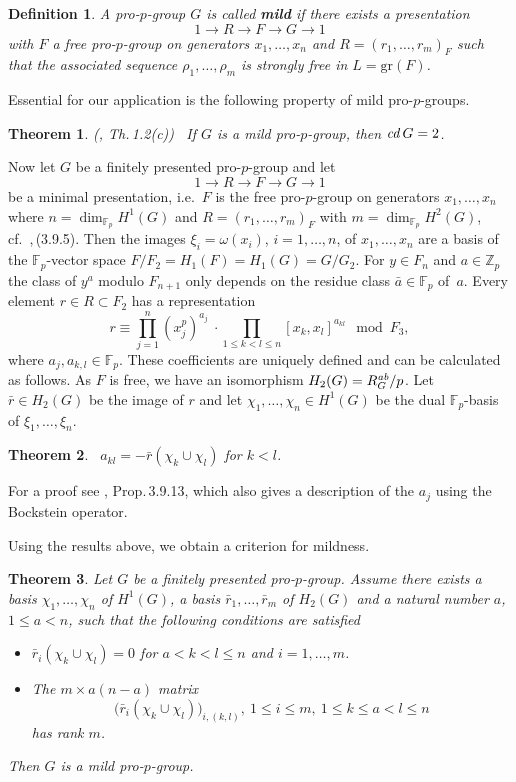 \documentclass[10pt]{article}
\newcommand{\Z}{{\mathbb Z}}
\newcommand{\F}{{\mathbb F}}
\newcommand{\ab}{\text{\it ab}}
\newcommand{\cd}{\text{\it cd}\:}
\newcommand{\gr}{\textrm{gr}}
\newcommand{\lang}{\longrightarrow}
\theoremstyle{alex}
\newtheorem{theorem}{Theorem}[section]
\theoremstyle{alexdef}
\newtheorem*{definition}{Definition}
\begin{document}
\begin{definition}
 A pro-$p$-group $G$ is called {\bf mild} if there exists a presentation
\[
1 \lang R \lang F \lang G \lang 1
\]
with $F$ a free pro-$p$-group on generators $x_1,\ldots,x_n$ and $R=(r_1,\ldots,r_m)_F$ such that the associated sequence  $\rho_1,\ldots,\rho_m$ is strongly free in $L=\gr(F)$.
\end{definition}

Essential for our application is the following property of mild pro-$p$-groups.

\begin{theorem}{\rm (\cite{La}, Th.\,1.2(c))} \label{mildcd2} \
If\/ $G$ is a mild pro-$p$-group, then $\cd G=2$.
\end{theorem}

Now let $G$ be a finitely presented pro-$p$-group and let
\[
1\lang R \lang F\lang G\lang 1
\]
be a minimal presentation, i.e.\ $F$ is the free pro-$p$-group on generators $x_1,\ldots, x_n$ where $n=\dim_{\F_p} H^1(G)$ and $R=(r_1,\ldots,r_m)_F$ with $m=\dim_{\F_p} H^2(G)$, cf.\ \cite{NSW},\,(3.9.5). Then the images $\xi_i=\omega(x_i)$, $i=1,\ldots, n$, of $x_1, \ldots, x_n$ are a basis of the $\F_p$-vector space  $F/F_2=H_1(F)=H_1(G)=G/G_2$.  For $y\in F_n$ and $a\in \Z_p$ the class of $y^a$ modulo $F_{n+1}$ only depends on the residue class $\bar a \in \F_p$ of~$a$.
Every element $r\in R\subset F_2$ has a representation
\[
r\equiv \prod_{j=1}^n (x_j^p)^{a_j} \  \cdot \prod_{1\leq k < l \leq n} [x_k,x_l]^{a_{kl}} \mod  F_3,
\]
where $a_j,a_{k,l} \in \F_p$. These coefficients are uniquely defined and can be calculated as follows. As $F$ is free, we have an isomorphism $H_2(G)=R_G^\ab/p$. Let $\bar r \in H_2(G)$ be the image of $r$ and
let $\chi_1,\ldots,\chi_n \in H^1(G)$ be the dual $\F_p$-basis of $\xi_1,\ldots,\xi_n$.

\begin{theorem}\label{coeff} \ $ a_{kl}=-\bar r(\chi_k\cup\chi_l)$ for $k<l$.
\end{theorem}

\noindent
For a proof see \cite{NSW}, Prop.\,3.9.13, which also gives a description of the $a_j$ using the Bockstein operator.




\bigskip
Using the results above, we obtain a criterion for mildness.


\begin{theorem} \label{mildkrit}
Let $G$ be a finitely presented pro-$p$-group. Assume there exists a basis $\chi_1,\ldots,\chi_n$ of $H^1(G)$, a basis $\bar r_1,\ldots,\bar r_m$ of $H_2(G)$ and a natural number $a$, $1\leq a < n$, such that the following conditions are satisfied
\begin{itemize}
\item[\rm (i)] $\bar r_i(\chi_k \cup \chi_l)=0$ for $a< k<l\leq n$ and $i=1,\ldots,m$.
\item[\rm (ii)] The $m{\times}a(n-a)$ matrix
\[
\Big(\bar r_i(\chi_k \cup \chi_l)\Big)_{i, (k,l)},\ 1\leq i\leq m,\ 1\leq k\leq a < l \leq n
\]
has rank $m$.
\end{itemize}
Then $G$ is a mild pro-$p$-group.
\end{theorem}
\end{document}
